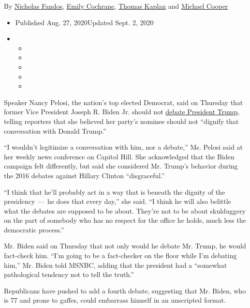 By \href{https://www.nytimes3xbfgragh.onion/by/nicholas-fandos}{Nicholas
Fandos},
\href{https://www.nytimes3xbfgragh.onion/by/emily-cochrane}{Emily
Cochrane},
\href{https://www.nytimes3xbfgragh.onion/by/thomas-kaplan}{Thomas
Kaplan} and
\href{https://www.nytimes3xbfgragh.onion/by/michael-cooper}{Michael
Cooper}

\begin{itemize}
\item
  Published Aug. 27, 2020Updated Sept. 2, 2020
\item
  \begin{itemize}
  \item
  \item
  \item
  \item
  \item
  \end{itemize}
\end{itemize}

Speaker Nancy Pelosi, the nation's top elected Democrat, said on
Thursday that former Vice President Joseph R. Biden Jr. should not
\href{https://www.nytimes3xbfgragh.onion/2020/09/02/business/media/trump-biden-debate-moderators.html}{debate
President Trump}, telling reporters that she believed her party's
nominee should not ``dignify that conversation with Donald Trump.''

``I wouldn't legitimize a conversation with him, nor a debate,'' Ms.
Pelosi said at her weekly news conference on Capitol Hill. She
acknowledged that the Biden campaign felt differently, but said she
considered Mr. Trump's behavior during the 2016 debates against Hillary
Clinton ``disgraceful.''

``I think that he'll probably act in a way that is beneath the dignity
of the presidency ---~he does that every day,'' she said. ``I think he
will also belittle what the debates are supposed to be about. They're
not to be about skulduggery on the part of somebody who has no respect
for the office he holds, much less the democratic process.''

Mr. Biden said on Thursday that not only would he debate Mr. Trump, he
would fact-check him. ``I'm going to be a fact-checker on the floor
while I'm debating him,'' Mr. Biden told MSNBC, adding that the
president had a ``somewhat pathological tendency not to tell the
truth.''

Republicans have pushed to add a fourth debate, suggesting that Mr.
Biden, who is 77 and prone to gaffes, could embarrass himself in an
unscripted format.

